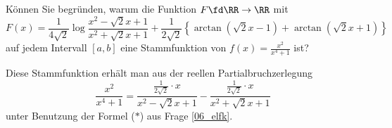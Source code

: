 \begin{frage}
Können Sie begründen, warum die Funktion 
$F\fd \RR\to\RR$ mit 
\[
F(x) = \frac{1}{4\sqrt{2}} \log 
\frac{x^2-\sqrt{2} x +1}{ x^2+\sqrt{2} x +1 } + 
\frac{1}{2\sqrt{2}} \left\{ 
\arctan( \sqrt{2} x-1 )+\arctan( \sqrt{2} x+1 ) \right\}
\]
auf jedem Intervall $[a,b]$ eine Stammfunktion von 
$f(x)=\frac{x^2}{x^4+1}$ ist?
\end{frage}

\begin{antwort}
Diese Stammfunktion erhält man aus der reellen Partialbruchzerlegung 
\[
\frac{x^2}{x^4+1} = 
\frac{ \frac{1}{2\sqrt{2}}\cdot x }{ x^2-\sqrt{2}x+1} - 
\frac{ \frac{1}{2\sqrt{2}}\cdot x }{ x^2+\sqrt{2}x+1}
\]
unter Benutzung der Formel ($\ast$) aus Frage \ref{06_elfk}.
\AntEnd 
\end{antwort} 




 
                                                                                                                                                                                                                      






 





 



 



  
  
 
   
 

 



  
 
 

 








 




 
